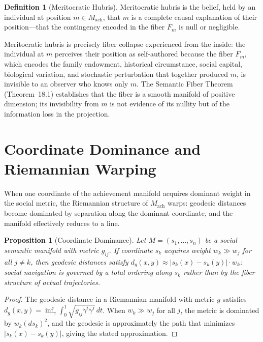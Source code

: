 \documentclass[12pt, oneside]{book}
\theoremstyle{flyxion}
\newtheorem{proposition}[theorem]{Proposition}
\theoremstyle{definition}
\newtheorem{definition}[theorem]{Definition}
\begin{document}
\begin{definition}[Meritocratic Hubris]
Meritocratic hubris is the belief, held by an
individual at position $m \in M_\mathrm{ach}$, that
$m$ is a complete causal explanation of their
position---that the contingency encoded in the fiber
$F_m$ is null or negligible.
\end{definition}

Meritocratic hubris is precisely fiber collapse
experienced from the inside: the individual at $m$
perceives their position as self-authored because
the fiber $F_m$, which encodes the family endowment,
historical circumstance, social capital, biological
variation, and stochastic perturbation that together
produced $m$, is invisible to an observer who knows
only $m$. The Semantic Fiber Theorem
(Theorem~18.1) establishes that the fiber is a smooth
manifold of positive dimension; its invisibility from
$m$ is not evidence of its nullity but of the
information loss in the projection.

\section{Coordinate Dominance and Riemannian Warping}

When one coordinate of the achievement manifold
acquires dominant weight in the social metric,
the Riemannian structure of $M_\mathrm{ach}$ warps:
geodesic distances become dominated by separation
along the dominant coordinate, and the manifold
effectively reduces to a line.

\begin{proposition}[Coordinate Dominance]
Let $M = (s_1, \ldots, s_n)$ be a social semantic
manifold with metric $g_{ij}$. If coordinate $s_k$
acquires weight $w_k \gg w_j$ for all $j \neq k$,
then geodesic distances satisfy $d_g(x,y) \approx
|s_k(x) - s_k(y)| \cdot w_k$: social navigation
is governed by a total ordering along $s_k$ rather
than by the fiber structure of actual trajectories.
\end{proposition}

\begin{proof}
The geodesic distance in a Riemannian manifold with
metric $g$ satisfies $d_g(x,y) = \inf_\gamma
\int_0^1 \sqrt{g_{ij}\dot\gamma^i\dot\gamma^j}\,dt$.
When $w_k \gg w_j$ for all $j$, the metric is
dominated by $w_k(ds_k)^2$, and the geodesic is
approximately the path that minimizes $|s_k(x)
- s_k(y)|$, giving the stated approximation.
\end{proof}
\end{document}
